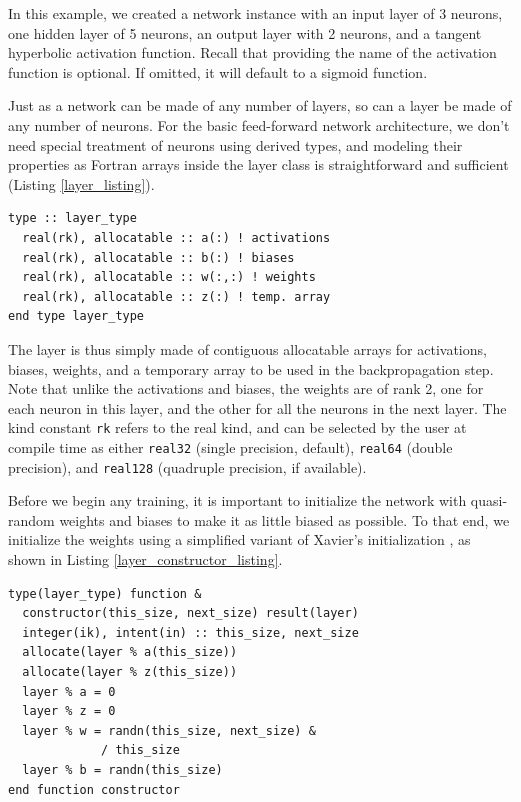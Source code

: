 \documentclass[sigplan, review=false, screen=true, balance=true]{acmart}
\begin{document}
In this example, we created a network instance with an input layer of 3 neurons,
one hidden layer of 5 neurons, an output layer with 2 neurons, and a tangent
hyperbolic activation function. Recall that providing the name of the activation
function is optional. If omitted, it will default to a sigmoid function.

Just as a network can be made of any number of layers, so can a layer be made
of any number of neurons. For the basic feed-forward network architecture,
we don't need special treatment of neurons using derived types, and modeling
their properties as Fortran arrays inside the layer class is straightforward
and sufficient (Listing \ref{layer_listing}).

\begin{minipage}{\linewidth}
\begin{lstlisting}[caption={Definition of the layer class.}, captionpos=b, label={layer_listing}]
type :: layer_type
  real(rk), allocatable :: a(:) ! activations
  real(rk), allocatable :: b(:) ! biases
  real(rk), allocatable :: w(:,:) ! weights
  real(rk), allocatable :: z(:) ! temp. array
end type layer_type
\end{lstlisting}
\end{minipage}

The layer is thus simply made of contiguous allocatable arrays for activations,
biases, weights, and a temporary array to be used in the backpropagation step.
Note that unlike the activations and biases, the weights are of rank 2, one for
each neuron in this layer, and the other for all the neurons in the next layer.
The kind constant \lstinline{rk} refers to the real kind, and can be selected
by the user at compile time as either \lstinline{real32} (single precision,
default), \lstinline{real64} (double precision), and \lstinline{real128}
(quadruple precision, if available).

Before we begin any training, it is important to initialize the network with
quasi-random weights and biases to make it as little biased as possible.
To that end, we initialize the weights using a simplified variant of Xavier's
initialization \citep{glorot10}, as shown in Listing \ref{layer_constructor_listing}.

\begin{minipage}{\linewidth}
\begin{lstlisting}[caption={Layer constructor.}, captionpos=b, label={layer_constructor_listing}]
type(layer_type) function &
  constructor(this_size, next_size) result(layer)
  integer(ik), intent(in) :: this_size, next_size
  allocate(layer % a(this_size))
  allocate(layer % z(this_size))
  layer % a = 0
  layer % z = 0
  layer % w = randn(this_size, next_size) &
             / this_size
  layer % b = randn(this_size)
end function constructor
\end{lstlisting}
\end{minipage}
\end{document}
